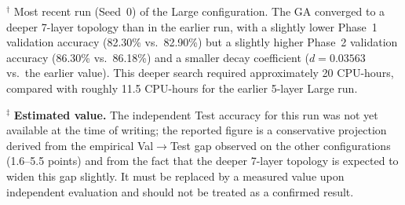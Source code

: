 \documentclass[preprint,12pt,review]{elsarticle}
\begin{document}
\begin{table}[htbp]
\caption{Scalability, Performance, and Baseline Comparison. \textbf{Note:} Phase 2 (Val) is biased because coefficients are optimized on it. Results are reported for a single seed due to CPU constraints. All final test accuracies are from independent evaluations, except for the most recent CIFAR-10 Large run (Seed~0, marked with $\ddagger$), whose independent Test accuracy was not yet measured and is reported as a conservative projection. That run evolved a deeper 7-layer topology and took approximately 20 CPU-hours.}
\label{tab1}
\end{table}

\noindent$^{\dagger}$ Most recent run (Seed~0) of the Large configuration. The GA converged to a deeper 7-layer topology than in the earlier run, with a slightly lower Phase~1 validation accuracy (82.30\% vs.\ 82.90\%) but a slightly higher Phase~2 validation accuracy (86.30\% vs.\ 86.18\%) and a smaller decay coefficient ($d = 0.03563$ vs.\ the earlier value). This deeper search required approximately 20 CPU-hours, compared with roughly 11.5 CPU-hours for the earlier 5-layer Large run.

\vspace{0.5cm}
\noindent$^{\ddagger}$ \textbf{Estimated value.} The independent Test accuracy for this run was not yet available at the time of writing; the reported figure is a conservative projection derived from the empirical Val$\rightarrow$Test gap observed on the other configurations (1.6--5.5 points) and from the fact that the deeper 7-layer topology is expected to widen this gap slightly. It must be replaced by a measured value upon independent evaluation and should not be treated as a confirmed result.
\end{document}

